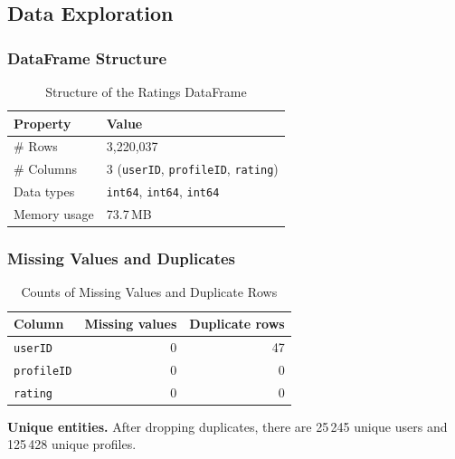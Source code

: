 \subsection*{Data Exploration}

\subsubsection*{DataFrame Structure}
\begin{table}[H]
  \centering
  \caption{Structure of the Ratings DataFrame}
  \label{tab:df-overview}
  \begin{tabular}{@{}ll@{}}
    \toprule
    Property      & Value                                             \\ 
    \midrule
    \# Rows       & 3{,}220{,}037                                     \\
    \# Columns    & 3 (\texttt{userID}, \texttt{profileID}, \texttt{rating})    \\
    Data types    & \texttt{int64}, \texttt{int64}, \texttt{int64}   \\
    Memory usage  & 73.7\,MB                                          \\
    \bottomrule
  \end{tabular}
\end{table}

\subsubsection*{Missing Values and Duplicates}
\begin{table}[H]
  \centering
  \caption{Counts of Missing Values and Duplicate Rows}
  \label{tab:missing-dup}
  \begin{tabular}{@{}lrr@{}}
    \toprule
    Column         & Missing values & Duplicate rows \\ 
    \midrule
    \texttt{userID}    & 0              & 47                \\
    \texttt{profileID} & 0              & 0                 \\
    \texttt{rating}    & 0              & 0                 \\
    \bottomrule
  \end{tabular}
\end{table}

\noindent\textbf{Unique entities.} After dropping duplicates, there are 25\,245 unique users and 125\,428 unique profiles.

